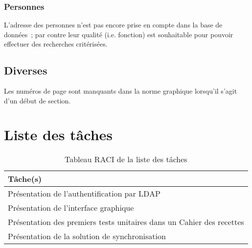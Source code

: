 \documentclass[11pt,fleqn]{report}
\begin{document}
\subsubsection{Personnes}
L'adresse des personnes n'est pas encore prise en compte dans la base de données~; par contre leur qualité (i.e. fonction) est souhaitable pour pouvoir effectuer des recherches critérisées.

\subsection{Diverses}
Les numéros de page sont manquants dans la norme graphique lorsqu'il s'agit d'un début de section.

\section{Liste des tâches}
\begin{table}[h]
	\begin{tabularx}{\linewidth}{X}
	\toprule
	\textbf{Tâche(s)} \\
	\midrule
	Présentation de l'authentification par LDAP \\
	Présentation de l'interface graphique \\
	Présentation des premiers tests unitaires dans un Cahier des recettes \\
	Présentation de la solution de synchronisation \\
	\bottomrule
	\end{tabularx}
	\caption{Tableau RACI de la liste des tâches}
\end{table}
\end{document}
